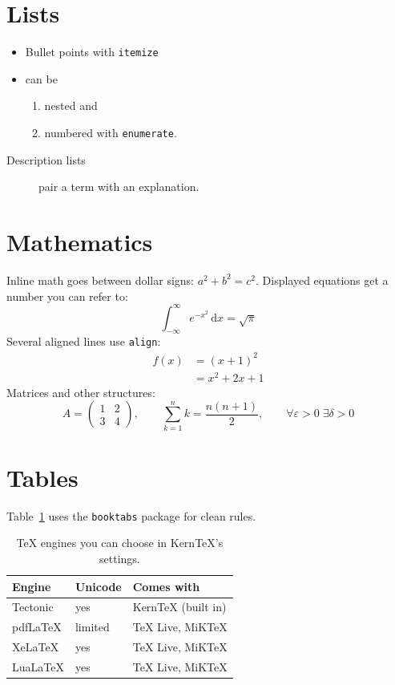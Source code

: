 \documentclass[11pt,a4paper]{article}
\begin{document}
\section{Lists}
\begin{itemize}
  \item Bullet points with \verb|itemize|
  \item can be
  \begin{enumerate}
    \item nested and
    \item numbered with \verb|enumerate|.
  \end{enumerate}
\end{itemize}
\begin{description}
  \item[Description lists] pair a term with an explanation.
\end{description}

\section{Mathematics}
\label{sec:math}
Inline math goes between dollar signs: $a^2 + b^2 = c^2$. Displayed equations
get a number you can refer to:
\begin{equation}
  \int_{-\infty}^{\infty} e^{-x^2}\,\mathrm{d}x = \sqrt{\pi}
  \label{eq:gauss}
\end{equation}
Several aligned lines use \verb|align|:
\begin{align}
  f(x) &= (x + 1)^2 \\
       &= x^2 + 2x + 1
\end{align}
Matrices and other structures:
\[
  A = \begin{pmatrix} 1 & 2 \\ 3 & 4 \end{pmatrix}, \qquad
  \sum_{k=1}^{n} k = \frac{n(n+1)}{2}, \qquad
  \forall \varepsilon > 0 \; \exists \delta > 0
\]

\section{Tables}
Table~\ref{tab:engines} uses the \verb|booktabs| package for clean rules.
\begin{table}[htbp]
  \centering
  \begin{tabular}{lll}
    \toprule
    Engine   & Unicode & Comes with \\
    \midrule
    Tectonic & yes     & KernTeX (built in) \\
    pdfLaTeX & limited & TeX Live, MiKTeX \\
    XeLaTeX  & yes     & TeX Live, MiKTeX \\
    LuaLaTeX & yes     & TeX Live, MiKTeX \\
    \bottomrule
  \end{tabular}
  \caption{TeX engines you can choose in KernTeX's settings.}
  \label{tab:engines}
\end{table}
\end{document}
